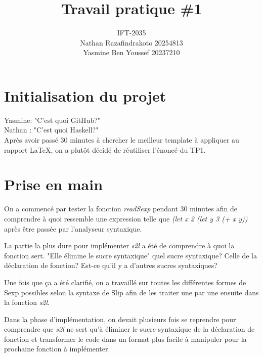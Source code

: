 \documentclass{article}
\title{Travail pratique \#1}
\author{IFT-2035 \\ Nathan Razafindrakoto 20254813 \\ Yasmine Ben Youssef 20237210}
\begin{document}
\maketitle

\newcommand \mML {\ensuremath\mu\textsl{ML}}
\newcommand \kw [1] {\textsf{#1}}
\newcommand \id [1] {\textsl{#1}}
\newcommand \punc [1] {\kw{`#1'}}
\newcommand \str [1] {\texttt{"#1"}}
\newenvironment{outitemize}{
  \begin{itemize}
  \let \origitem \item \def \item {\origitem[]\hspace{-18pt}}
}{
  \end{itemize}
}
\newcommand \Align [2][t] {\begin{array}[#1]{@{}l} #2 \end{array}}


\section{Initialisation du projet}

Yasmine: "C'est quoi GitHub?"
\\
Nathan : "C'est quoi Haskell?"\\
Après avoir passé 30 minutes à chercher le meilleur template à appliquer au rapport LaTeX, on a plutôt décidé de réutiliser l'énoncé du TP1.

\section{Prise en main}
On a commencé par tester la fonction \textit{readSexp} pendant 30 minutes afin de comprendre à quoi ressemble une expression telle que \textit{(let x 2 (let y 3 (+ x y))} après être passée par l'analyseur syntaxique.

La partie la plus dure pour implémenter \textit{s2l} a été de comprendre à quoi la fonction sert. "Elle élimine le sucre syntaxique" quel sucre syntaxique? Celle de la déclaration de fonction? Est-ce qu'il y a d'autres sucres syntaxiques?

Une fois que ça a été clarifié, on a travaillé sur toutes les différentes formes de Sexp possibles selon la syntaxe de Slip afin de les traiter une par une ensuite dans la fonction \textit{s2l}. 

Dans la phase d'implémentation, on devait plusieurs fois se reprendre pour comprendre que \textit{s2l} ne sert qu'à éliminer le sucre syntaxique de la déclaration de fonction et transformer le code dans un format plus facile à manipuler pour la prochaine fonction à implémenter.
\end{document}
